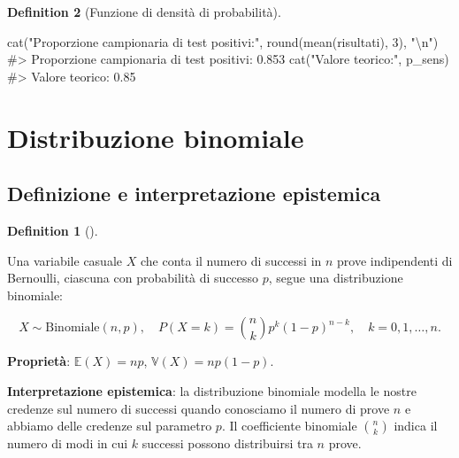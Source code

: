 \documentclass[
  letterpaper,
  DIV=11,
  numbers=noendperiod,
  oneside]{scrreprt}
\newenvironment{Shaded}{\begin{snugshade}}{\end{snugshade}}
\newcommand{\CommentTok}[1]{\textcolor[rgb]{0.37,0.37,0.37}{#1}}
\newcommand{\DecValTok}[1]{\textcolor[rgb]{0.68,0.00,0.00}{#1}}
\newcommand{\FunctionTok}[1]{\textcolor[rgb]{0.28,0.35,0.67}{#1}}
\newcommand{\NormalTok}[1]{\textcolor[rgb]{0.00,0.23,0.31}{#1}}
\newcommand{\SpecialCharTok}[1]{\textcolor[rgb]{0.37,0.37,0.37}{#1}}
\newcommand{\StringTok}[1]{\textcolor[rgb]{0.13,0.47,0.30}{#1}}
\theoremstyle{definition}
\theoremstyle{plain}
\theoremstyle{definition}
\newtheorem{definition}{Definition}[chapter]
\theoremstyle{remark}
\begin{document}
\begin{definition}[Funzione di densità di
probabilità]
\begin{Shaded}
\begin{Highlighting}[]
\FunctionTok{cat}\NormalTok{(}\StringTok{"Proporzione campionaria di test positivi:"}\NormalTok{, }\FunctionTok{round}\NormalTok{(}\FunctionTok{mean}\NormalTok{(risultati), }\DecValTok{3}\NormalTok{), }\StringTok{"}\SpecialCharTok{\textbackslash{}n}\StringTok{"}\NormalTok{)}
\CommentTok{\#\textgreater{} Proporzione campionaria di test positivi: 0.853}
\FunctionTok{cat}\NormalTok{(}\StringTok{"Valore teorico:"}\NormalTok{, p\_sens)}
\CommentTok{\#\textgreater{} Valore teorico: 0.85}
\end{Highlighting}
\end{Shaded}

\section{Distribuzione binomiale}\label{distribuzione-binomiale}

\subsection{Definizione e interpretazione
epistemica}\label{definizione-e-interpretazione-epistemica-3}

\begin{definition}[]\protect\hypertarget{def-binomial}{}\label{def-binomial}

Una variabile casuale \(X\) che conta il numero di successi in \(n\)
prove indipendenti di Bernoulli, ciascuna con probabilità di successo
\(p\), segue una distribuzione binomiale:

\[
X \sim \text{Binomiale}(n, p), \quad P(X = k) = \binom{n}{k} p^k (1-p)^{n-k}, \quad k = 0, 1, \dots, n.
\]

\textbf{Proprietà}: \(\mathbb{E}(X) = np\), \(\mathbb{V}(X) = np(1-p)\).

\end{definition}

\textbf{Interpretazione epistemica}: la distribuzione binomiale modella
le nostre credenze sul numero di successi quando conosciamo il numero di
prove \(n\) e abbiamo delle credenze sul parametro \(p\). Il
coefficiente binomiale \(\binom{n}{k}\) indica il numero di modi in cui
\(k\) successi possono distribuirsi tra \(n\) prove.

\begin{tcolorbox}[enhanced jigsaw, arc=.35mm, breakable, colbacktitle=quarto-callout-note-color!10!white, opacityback=0, toprule=.15mm, rightrule=.15mm, colback=white, opacitybacktitle=0.6, leftrule=.75mm, coltitle=black, bottomtitle=1mm, left=2mm, toptitle=1mm, title=\textcolor{quarto-callout-note-color}{\faInfo}\hspace{0.5em}{Derivazione della formula}, titlerule=0mm, bottomrule=.15mm, colframe=quarto-callout-note-color-frame]


\end{tcolorbox}
\end{definition}
\end{document}

